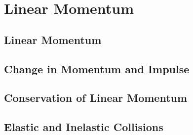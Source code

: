 \documentclass[../mech.tex]{subfiles}
\begin{document}
\chapter{Linear Momentum}
\section{Linear Momentum}
\section{Change in Momentum and Impulse}
\section{Conservation of Linear Momentum}
\section{Elastic and Inelastic Collisions}
\end{document}
